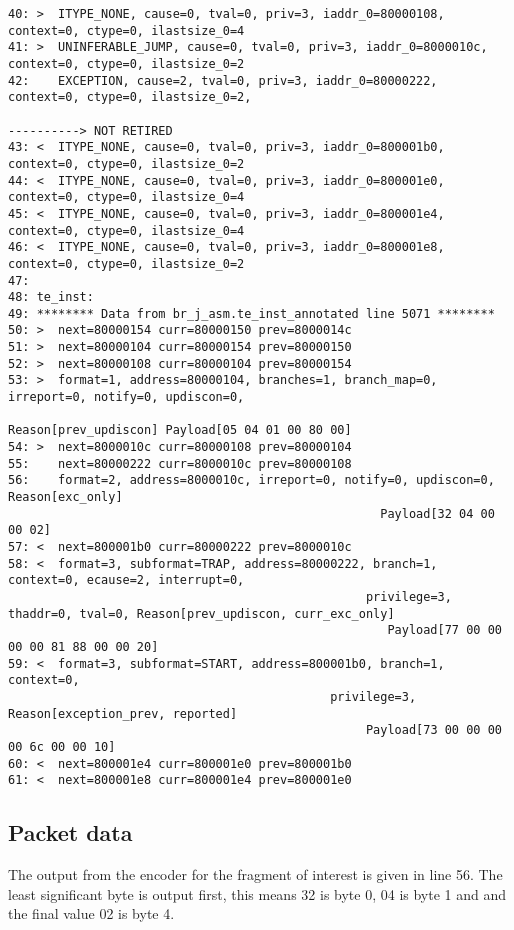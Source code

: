 \begin {lstlisting}[basicstyle=\tiny]
40: >  ITYPE_NONE, cause=0, tval=0, priv=3, iaddr_0=80000108, context=0, ctype=0, ilastsize_0=4
41: >  UNINFERABLE_JUMP, cause=0, tval=0, priv=3, iaddr_0=8000010c, context=0, ctype=0, ilastsize_0=2
42:    EXCEPTION, cause=2, tval=0, priv=3, iaddr_0=80000222, context=0, ctype=0, ilastsize_0=2,
                                                                              ----------> NOT RETIRED
43: <  ITYPE_NONE, cause=0, tval=0, priv=3, iaddr_0=800001b0, context=0, ctype=0, ilastsize_0=2
44: <  ITYPE_NONE, cause=0, tval=0, priv=3, iaddr_0=800001e0, context=0, ctype=0, ilastsize_0=4
45: <  ITYPE_NONE, cause=0, tval=0, priv=3, iaddr_0=800001e4, context=0, ctype=0, ilastsize_0=4
46: <  ITYPE_NONE, cause=0, tval=0, priv=3, iaddr_0=800001e8, context=0, ctype=0, ilastsize_0=2
47:
48: te_inst:
49: ******** Data from br_j_asm.te_inst_annotated line 5071 ********
50: >  next=80000154 curr=80000150 prev=8000014c
51: >  next=80000104 curr=80000154 prev=80000150
52: >  next=80000108 curr=80000104 prev=80000154
53: >  format=1, address=80000104, branches=1, branch_map=0, irreport=0, notify=0, updiscon=0,
                                                  Reason[prev_updiscon] Payload[05 04 01 00 80 00]
54: >  next=8000010c curr=80000108 prev=80000104
55:    next=80000222 curr=8000010c prev=80000108
56:    format=2, address=8000010c, irreport=0, notify=0, updiscon=0, Reason[exc_only]
                                                    Payload[32 04 00 00 02]
57: <  next=800001b0 curr=80000222 prev=8000010c
58: <  format=3, subformat=TRAP, address=80000222, branch=1, context=0, ecause=2, interrupt=0, 
                                                  privilege=3, thaddr=0, tval=0, Reason[prev_updiscon, curr_exc_only] 
                                                     Payload[77 00 00 00 00 81 88 00 00 20]
59: <  format=3, subformat=START, address=800001b0, branch=1, context=0,
                                             privilege=3, Reason[exception_prev, reported]
                                                  Payload[73 00 00 00 00 6c 00 00 10]
60: <  next=800001e4 curr=800001e0 prev=800001b0
61: <  next=800001e8 curr=800001e4 prev=800001e0
\end{lstlisting}

\subsection{Packet data}

The output from the encoder for the fragment of interest is given in
line 56. The least significant byte is output first, this means 32 is
byte 0, 04 is byte 1 and and the final value 02 is byte 4.

